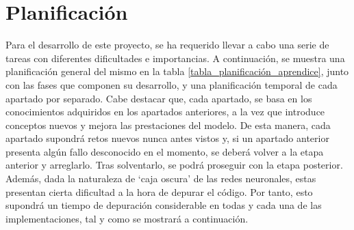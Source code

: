 
\chapter{Planificación} \label{planificacion}

Para el desarrollo de este proyecto, se ha requerido llevar a cabo una serie de tareas con diferentes dificultades e importancias. A continuación, se muestra una planificación general del mismo en la tabla \ref{tabla_planificación_aprendice}, junto con las fases que componen su desarrollo, y una planificación temporal de cada apartado por separado. Cabe destacar que, cada apartado, se basa en los conocimientos adquiridos en los apartados anteriores, a la vez que introduce conceptos nuevos y mejora las prestaciones del modelo. De esta manera, cada apartado supondrá retos nuevos nunca antes vistos y, si un apartado anterior presenta algún fallo desconocido en el momento, se deberá volver a la etapa anterior y arreglarlo. Tras solventarlo, se podrá proseguir con la etapa posterior. Además, dada la naturaleza de `caja oscura' de las redes neuronales, estas presentan cierta dificultad a la hora de depurar el código. Por tanto, esto supondrá un tiempo de depuración considerable en todas y cada una de las implementaciones, tal y como se mostrará a continuación.


